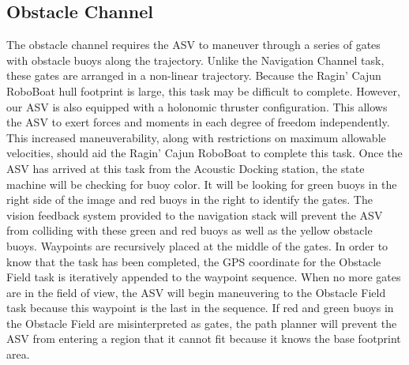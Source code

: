 \documentclass[letterpaper, 12 pt, conference]{ieeeconf}
\begin{document}
\subsection{Obstacle Channel}
\label{ObstacleChannel}
The obstacle channel requires the ASV to maneuver through a series of gates with obstacle buoys along the trajectory. Unlike the Navigation Channel task, these gates are arranged in a non-linear trajectory. Because the Ragin' Cajun RoboBoat hull footprint is large, this task may be difficult to complete. However, our ASV is also equipped with a holonomic thruster configuration. This allows the ASV to exert forces and moments in each degree of freedom independently. This increased maneuverability, along with restrictions on maximum allowable velocities, should aid the Ragin' Cajun RoboBoat to complete this task. Once the ASV has arrived at this task from the Acoustic Docking station, the state machine will be checking for buoy color. It will be looking for green buoys in the right side of the image and red buoys in the right to identify the gates. The vision feedback system provided to the navigation stack will prevent the ASV from colliding with these green and red buoys as well as the yellow obstacle buoys. Waypoints are recursively placed at the middle of the gates. In order to know that the task has been completed, the GPS coordinate for the Obstacle Field task is iteratively appended to the waypoint sequence. When no more gates are in the field of view, the ASV will begin maneuvering to the Obstacle Field task because this waypoint is the last in the sequence. If red and green buoys in the Obstacle Field are misinterpreted as gates, the path planner will prevent the ASV from entering a region that it cannot fit because it knows the base footprint area.
\end{document}
